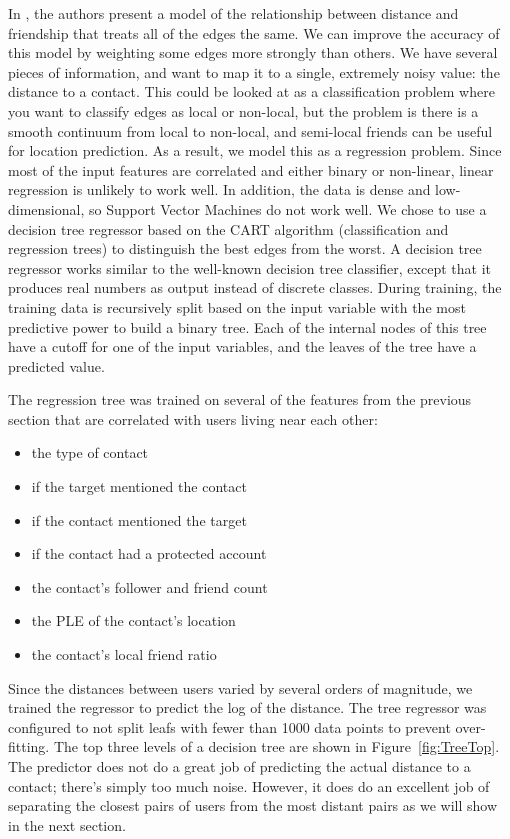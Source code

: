 In \cite{backstrom2010find}, the authors present a model of the relationship
between distance and friendship that treats all of the edges the same.
%
We can improve the accuracy of this model by weighting some edges more strongly
than others.
%
We have several pieces of information, and want to map it to a single, extremely
noisy value: the distance to a contact.
%
This could be looked at as a classification problem where you want to classify
edges as local or non-local, but the problem is there is a smooth continuum
from local to non-local, and semi-local friends can be useful for location
prediction.
%
As a result, we model this as a regression problem.
%
Since most of the input features are correlated and either binary or non-linear,
linear regression is unlikely to work well.
%
In addition, the data is dense and low-dimensional, so Support Vector Machines
do not work well.
%
We chose to use a decision tree regressor based on the CART algorithm
(classification and regression trees) to distinguish the best edges from the
worst.
%
A decision tree regressor works similar to the well-known decision tree
classifier, except that it produces real numbers as output instead of discrete
classes.
%
During training, the training data is recursively split based on the input
variable with the most predictive power to build a binary tree.
%
Each of the internal nodes of this tree have a cutoff for one of the input
variables, and the leaves of the tree have a predicted value.
%

The regression tree was trained on several of the features from the previous
section that are correlated with users living near each other:
\begin{itemize}
\item the type of contact
\item if the target mentioned the contact
\item if the contact mentioned the target
\item if the contact had a protected account
\item the contact's follower and friend count
\item the PLE of the contact's location
\item the contact's local friend ratio
\end{itemize}
%
Since the distances between users varied by several orders of magnitude, we
trained the regressor to predict the log of the distance.
%
The tree regressor was configured to not split leafs with fewer than 1000 data
points to prevent over-fitting.
%
The top three levels of a decision tree are shown in Figure~\ref{fig:TreeTop}.
%
The predictor does not do a great job of predicting the actual distance to a
contact; there's simply too much noise.
%
However, it does do an excellent job of separating the closest pairs of users
from the most distant pairs as we will show in the next section.

